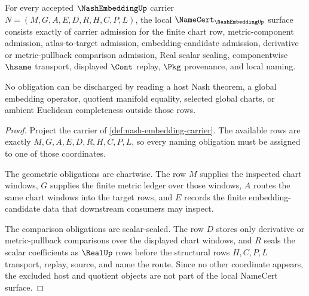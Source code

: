 \begin{theorem}
\label{thm:nash-embedding-namecert-obligations}
For every accepted $\NashEmbeddingUp$ carrier $N=(M,G,A,E,D,R,H,C,P,L)$, the local $\NameCert_{\NashEmbeddingUp}$ surface consists exactly of carrier admission for the finite chart row, metric-component admission, atlas-to-target admission, embedding-candidate admission, derivative or metric-pullback comparison admission, Real scalar sealing, componentwise $\hsame$ transport, displayed $\Cont$ replay, $\Pkg$ provenance, and local naming.

No obligation can be discharged by reading a host Nash theorem, a global embedding operator, quotient manifold equality, selected global charts, or ambient Euclidean completeness outside those rows.
\end{theorem}
\begin{proof}
Project the carrier of \autoref{def:nash-embedding-carrier}. The available rows are exactly $M,G,A,E,D,R,H,C,P,L$, so every naming obligation must be assigned to one of those coordinates.

The geometric obligations are chartwise. The row $M$ supplies the inspected chart windows, $G$ supplies the finite metric ledger over those windows, $A$ routes the same chart windows into the target rows, and $E$ records the finite embedding-candidate data that downstream consumers may inspect.

The comparison obligations are scalar-sealed. The row $D$ stores only derivative or metric-pullback comparisons over the displayed chart windows, and $R$ seals the scalar coefficients as $\RealUp$ rows before the structural rows $H,C,P,L$ transport, replay, source, and name the route. Since no other coordinate appears, the excluded host and quotient objects are not part of the local NameCert surface.
\end{proof}


